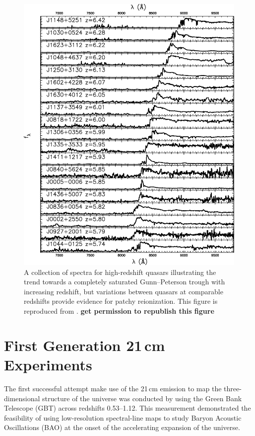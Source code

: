 \begin{bibunit}
\begin{figure}[p]
    \centering
    \includegraphics[width=\textwidth]{figures/chapter1/fan-quasar-spectra}
    \caption{
        A collection of spectra for high-redshift quasars illustrating the trend towards a
        completely saturated Gunn--Peterson trough with increasing redshift, but variations between
        quasars at comparable redshifts provide evidence for patchy reionization. This figure is
        reproduced from \citet{2006AJ....132..117F}. \textbf{get permission to republish this
        figure}
    }
    \label{fig:fan-quasars}
\end{figure}

\section{First Generation 21\,cm Experiments}

The first successful attempt make use of the 21\,cm emission to map the three-dimensional structure
of the universe was conducted by \citet{2010Natur.466..463C} using the Green Bank Telescope (GBT)
across redshifts 0.53--1.12. This measurement demonstrated the feasibility of using low-resolution
spectral-line maps to study Baryon Acoustic Oscillations (BAO) at the onset of the accelerating
expansion of the universe.


\end{bibunit}

